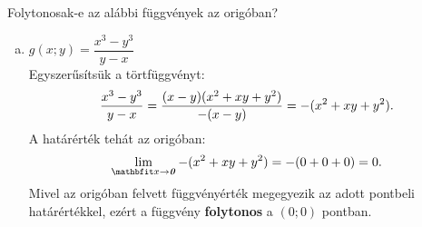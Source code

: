 \begin{exercise}{Folytonosak-e az alábbi függvények az origóban?}
{\begin{enumerate}[a)]
      \item $g(x; y) = \dfrac{x^3 - y^3}{{y - x}}$\\[2mm]
            Egyszerűsítsük a törtfüggvényt:
            \[
              \frac{x^3 - y^3}{y - x} =
              \frac{(x - y)(x^2 + xy + y^2)}{-(x - y)} =
              -(x^2 + xy + y^2)
              \text.
            \]
            A határérték tehát az origóban:
            \[
              \lim_{\rvec x \rightarrow \nvec} -(x^2 + xy + y^2)
              = -(0 + 0 + 0)
              = 0
              \text.
            \]
            Mivel az origóban felvett függvényérték megegyezik az adott
            pontbeli határértékkel, ezért a függvény \textbf{folytonos} a
            $(0;0)$ pontban.
    \end{enumerate}
  }
\end{exercise}
